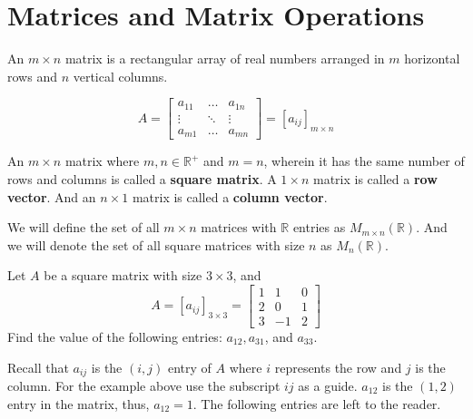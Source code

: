 \section{Matrices and Matrix Operations}

\begin{definition}
An $m \times n$ matrix is a rectangular array of real numbers arranged in $m$ horizontal rows and $n$ vertical columns.
\end{definition}

$$A = \left [
\begin{matrix}
a_{11} & \dots & a_{1n} \\
\vdots & \ddots & \vdots \\
a_{m1} & \dots & a_{mn}
\end{matrix} \right ] = [a_{ij}]_{m \times n}
$$

\begin{definition}
An $m \times n$ matrix where $m, n \in \mathbb{R}^+$ and $m = n$, wherein it has the same number of rows and columns is called a \textbf{square matrix}. A $1 \times n$ matrix is called a \textbf{row vector}. And an $n \times 1$ matrix is called a \textbf{column vector}.
\end{definition}

\begin{definition}
We will define the set of all $m \times n$ matrices with $\mathbb{R}$ entries as $M_{m \times n}(\mathbb{R})$. And we will denote the set of all square matrices with size $n$ as $M_n(\mathbb{R})$.
\end{definition}

\begin{example}
Let $A$ be a square matrix with size $3 \times 3$, and 
$$ A = [a_{ij}]_{3 \times 3} = 
    \left [ 
    \begin{matrix}
    1 & 1 & 0 \\
    2 & 0 & 1 \\
    3 & -1 & 2
    \end{matrix} 
\right ]$$
Find the value of the following entries: $a_{12}, a_{31}$, and $a_{33}$.

Recall that $a_{ij}$ is the $(i, j)$ entry of $A$ where $i$ represents the row and $j$ is the column. For the example above use the subscript $ij$ as a guide. $a_{12}$ is the $(1, 2)$ entry in the matrix, thus, $a_{12} = 1$. The following entries are left to the reader.

\end{example}

